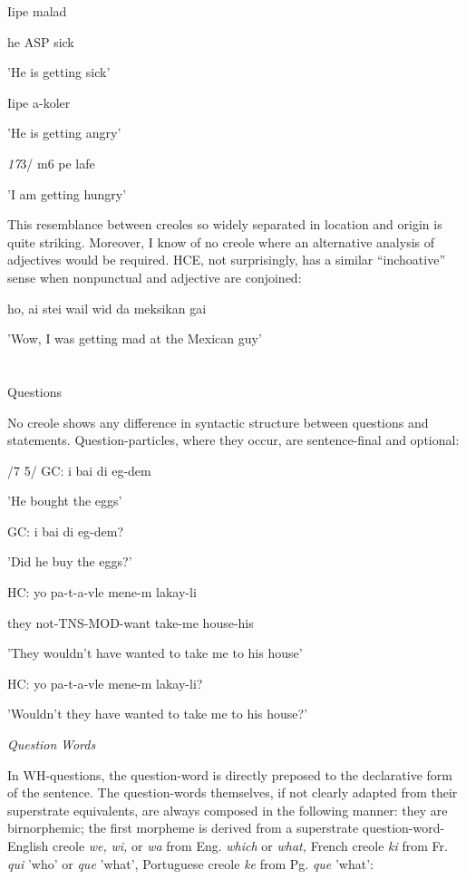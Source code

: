 \ea\label{ex:71}
 Iipe malad
\glt
\z

he ASP sick

'He is getting sick'

\ea\label{ex:72}
 Iipe a-koler
\glt
\z

'He is getting angry'

\textit{17}3/ m6 pe lafe

'I am getting hungry'

This resemblance between creoles so widely separated in location and origin is quite striking. Moreover, I know of no creole where an alterna\-tive analysis of adjectives would be required. HCE, not surprisingly, has a similar ``inchoative'' sense when nonpunctual and adjective are conjoined:

\ea\label{ex:74}
 ho, ai stei wail wid da meksikan gai
\glt
\z

'Wow, I was getting mad at the Mexican guy'


\section{}
Questions

No creole shows any difference in syntactic structure between questions and statements. Question-particles, where they occur, are sentence-final and optional:

/7 5/ GC: i bai di eg-dem

'He bought the eggs'

\ea\label{ex:76}
 GC: i bai di eg-dem?
\glt
\z

'Did he buy the eggs?'

\ea\label{ex:77}
 HC: yo pa-t-a-vle mene-m lakay-li
\glt
\z

they not-TNS-MOD-want take-me house-his

'They wouldn't have wanted to take me to his house'

\ea\label{ex:78}
 HC: yo pa-t-a-vle mene-m lakay-li?
\glt
\z

'Wouldn't they have wanted to take me to his house?'

\textit{Question} \textit{Words}

In WH-questions, the question-word is directly preposed to the declarative form of the sentence. The question-words themselves, if not clearly adapted from their superstrate equivalents, are always composed in the following manner: they are birnorphemic; the first morpheme is derived from a superstrate question-word- English creole \textit{we,} \textit{wi,} or \textit{wa} from Eng. \textit{which} or \textit{what,} French creole \textit{ki} from Fr. \textit{qui} 'who' or \textit{que} 'what', Portuguese creole \textit{ke} from Pg. \textit{que} 'what':

